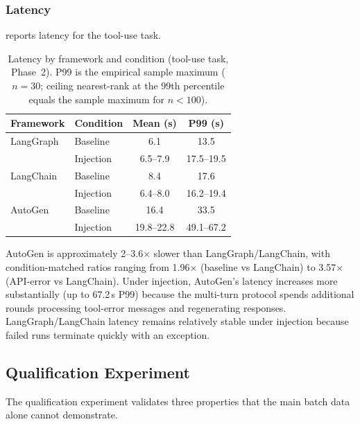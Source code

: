 \documentclass[make,article,submit,moreauthors,pdftex]{mdpi}
\begin{document}
\subsubsection{Latency}\label{sec:phase2-latency}

 reports latency for the tool-use task.

\begin{table}[htbp]
\caption{Latency by framework and condition (tool-use task, Phase~2). P99 is the empirical sample maximum ($n = 30$; ceiling nearest-rank at the 99th percentile equals the sample maximum for $n < 100$).}\label{tab:phase2-latency}
\centering
\begin{tabular}{llcc}
\toprule
\textbf{Framework} & \textbf{Condition} & \textbf{Mean (s)} & \textbf{P99 (s)} \\
\midrule
LangGraph  & Baseline    & 6.1  & 13.5 \\
           & Injection   & 6.5--7.9 & 17.5--19.5 \\
LangChain  & Baseline    & 8.4  & 17.6 \\
           & Injection   & 6.4--8.0 & 16.2--19.4 \\
AutoGen    & Baseline    & 16.4 & 33.5 \\
           & Injection   & 19.8--22.8 & 49.1--67.2 \\
\bottomrule
\end{tabular}
\end{table}

AutoGen is approximately 2--3.6$\times$ slower than LangGraph/LangChain, with condition-matched ratios ranging from 1.96$\times$ (baseline vs LangChain) to 3.57$\times$ (API-error vs LangChain). Under injection, AutoGen's latency increases more substantially (up to 67.2\,s P99) because the multi-turn protocol spends additional rounds processing tool-error messages and regenerating responses. LangGraph/LangChain latency remains relatively stable under injection because failed runs terminate quickly with an exception.


\subsection{Qualification Experiment}\label{sec:qualification}

The qualification experiment validates three properties that the main batch data alone cannot demonstrate.
\end{document}
